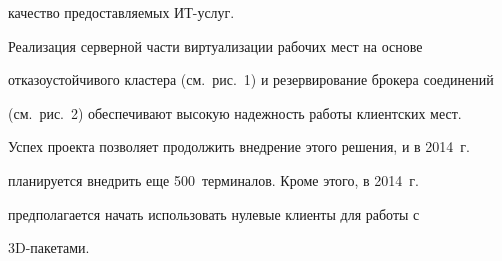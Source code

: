 качество предоставляемых ИТ-услуг.

  

  Реализация серверной части виртуализации рабочих мест на основе 

отказоустойчивого кластера (см.\ рис.~1) и резервирование брокера соединений 

(см.\ рис.~2) обеспечивают высокую надежность работы клиентских мест. 

  

  Успех проекта позволяет продолжить внедрение этого решения, и в 2014~г.\ 

планируется внедрить еще 500~терминалов. Кроме этого, в 2014~г.\ 

предполагается начать использовать нулевые клиенты для работы с 

  3D-па\-ке\-тами. 

  

  \vspace*{-4pt}



